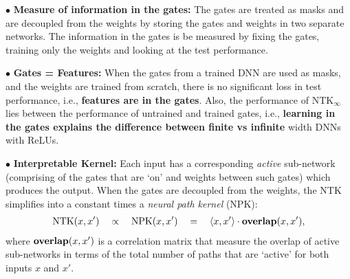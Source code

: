 $\bullet$ \textbf{Measure of information in the gates:} The gates are treated as masks and are decoupled from the weights by storing the gates and weights in two separate networks. The information in the gates is be measured by fixing the gates, training only the weights and looking at the test performance.  

$\bullet$ \textbf{Gates = Features:} When the gates from a trained DNN are used as masks, and the weights are trained from scratch, there is no significant loss in test performance, i.e., \textbf{features are in the gates}. Also, the performance of $\text{NTK}_{\infty}$ lies between the performance of untrained and trained gates, i.e., \textbf{learning in the gates explains the difference between finite vs infinite} width DNNs with ReLUs.

$\bullet$ \textbf{Interpretable Kernel:} Each input has a corresponding \emph{active} sub-network (comprising of the gates that are `on' and weights between such gates) which produces the output.  When the gates are decoupled from the weights, the NTK simplifies into a constant times a \emph{neural path kernel} (NPK):
\begin{align}\label{eq:ntk-npk-relation}
\text{NTK}(x,x')\quad\propto\quad \text{NPK}(x,x')\quad =\quad \langle x,x'\rangle\cdot {\bf{overlap}}(x,x'),
\end{align}
where ${\bf{overlap}}(x,x')$ is a correlation matrix that measure the overlap of active sub-networks in terms of the  total number of paths that are `active' for both inputs $x$ and $x'$. 

\begin{comment}
\begin{center}
\emph{Duality: DNNs with ReLU are layers as well as paths}
\end{center}
The standard primal way of expressing information processing is layer by layer. In the dual view, the DNN is broken into paths. A path comprises of gates and weights, and a path is `active' or `on' only if all the gates in the path are `on'. The output is the sum of the contribution of the individual paths. 
\begin{center}
\emph{Most information (i.e., features) is in the gates and gates are learnt during training}
\end{center}
The gates are treated as masks and are decoupled from the weights by storing the gates and weights in two separate networks (see \Cref{sec:dgn}). Now, the information in the gates can be measured by fixing the gates and training the weights. It was shown that (i) when the gates from a trained DNN are used as masks, and the weights are trained from scratch, there is no significant loss in test performance, i.e., \textbf{features are stored in the gates} and (ii) gates of a trained network perform better than $\text{NTK}_{\infty}$ and gates from a untrained network performs poorly than $\text{NTK}_{\infty}$, i.e., \textbf{learning in the gates explains the difference between finite vs infinite} width DNNs with ReLUs.
\begin{center}
\emph{NTK is interpretable in terms of active sub-networks}
\end{center}
\end{comment}


